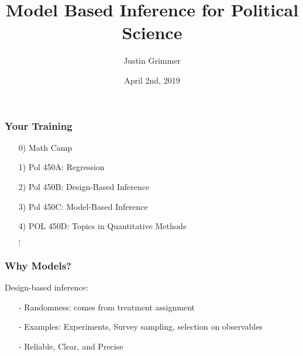 \documentclass{beamer}
\title[PS 450c] %
{Model Based Inference for Political Science}
\author[Grimmer]{Justin Grimmer}
\institute[Stanford University]{Professor\\
Department of Political Science\\
Stanford University}
\date{April 2nd, 2019}%
\begin{document}
\begin{frame}
\titlepage
\end{frame}


\begin{frame}
\frametitle{Your Training}
\begin{itemize}
\item[0)] Math Camp
\item[1)] Pol 450A: Regression
\item[2)] Pol 450B: Design-Based Inference
\item[3)] \alert{Pol 450C: Model-Based Inference}
\item[4)] POL 450D: Topics in Quantitative Methods
\item[] $\vdots$
\end{itemize}

\end{frame}




\begin{frame}
\frametitle{Why Models?}

Design-based inference:
\begin{itemize}
\item[-] Randomness: comes from treatment assignment
\item[-] Examples: Experiments, Survey sampling, selection on observables
\item[-] Reliable, Clear, and Precise
\end{itemize}

\end{frame}
\end{document}
